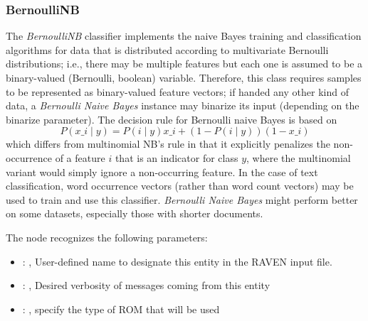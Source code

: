 \subsubsection{BernoulliNB}
  The \textit{BernoulliNB} classifier implements the naive Bayes training and
  classification algorithms for data that is distributed according to multivariate
  Bernoulli distributions; i.e., there may be multiple features but each one is
  assumed to be a binary-valued (Bernoulli, boolean) variable.                          Therefore,
  this class requires samples to be represented as binary-valued                          feature
  vectors; if handed any other kind of data, a \textit{Bernoulli Naive
  Bayes} instance may binarize its input (depending on the binarize parameter).
  The decision rule for Bernoulli naive Bayes is based on                          \begin{equation}
  P(x\_i \mid y) = P(i \mid y) x\_i + (1 - P(i \mid y)) (1 - x\_i)
  \end{equation}                          which differs from multinomial NB's rule in that it
  explicitly penalizes the                          non-occurrence of a feature $i$ that is an
  indicator for class $y$, where the                          multinomial variant would simply
  ignore a non-occurring feature.                          In the case of text classification, word
  occurrence vectors (rather than word                          count vectors) may be used to train
  and use this classifier.                          \textit{Bernoulli Naive Bayes} might perform
  better on some datasets, especially                          those with shorter documents.

  The  node recognizes the following parameters:
    \begin{itemize}
      \item {}: ,
        User-defined name to designate this entity in the RAVEN input file.
      \item {}: ,
        Desired verbosity of messages coming from this entity
      \item {}: ,
        specify the type of ROM that will be used
  \end{itemize}

